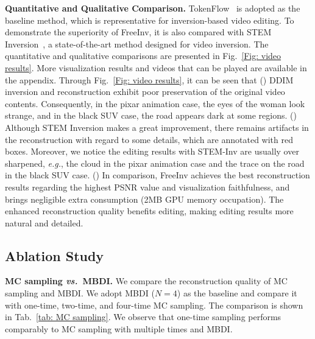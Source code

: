\documentclass{article}
\newcommand{\rmnum}[1]{\romannumeral #1}    %
\begin{document}
\noindent \textbf{Quantitative and Qualitative Comparison.}
TokenFlow~\cite{geyer2023tokenflow} is adopted as the baseline method, which is representative for inversion-based video editing.
To demonstrate the superiority of FreeInv, it is also compared with STEM Inversion~\cite{li2024video}, a state-of-the-art method designed for video inversion.
The quantitative and qualitative comparisons are presented in Fig.~\ref{Fig: video results}. 
More visualization results and videos that can be played are available in the appendix.
Through Fig.~\ref{Fig: video results}, it can be seen that (\rmnum{1}) DDIM inversion and reconstruction exhibit poor preservation of the original video contents. Consequently, in the pixar animation case, the eyes of the woman look strange, and in the black SUV case, the road appears dark at some regions. (\rmnum{2}) Although STEM Inversion makes a great improvement, there remains artifacts in the reconstruction with regard to some details, which are annotated with red boxes. Moreover, we notice the editing results with STEM-Inv are usually over sharpened, \emph{e.g.}, the cloud in the pixar animation case and the trace on the road in the black SUV case. (\rmnum{3}) In comparison, FreeInv achieves the best reconstruction results regarding the highest PSNR value and visualization faithfulness, and brings negligible extra consumption (2MB GPU memory occupation).  The enhanced reconstruction quality benefits editing, making editing results more natural and detailed.


\subsection{Ablation Study}
\label{sec: ablation}


\noindent \textbf{MC sampling \emph{vs.}~MBDI.}
We compare the reconstruction quality of MC sampling and MBDI. We adopt MBDI ($N=4$) as the baseline and compare it with one-time, two-time, and four-time MC sampling. The comparison is shown in Tab.~\ref{tab: MC sampling}. We observe that one-time sampling performs comparably to MC sampling with multiple times and MBDI.
\end{document}

